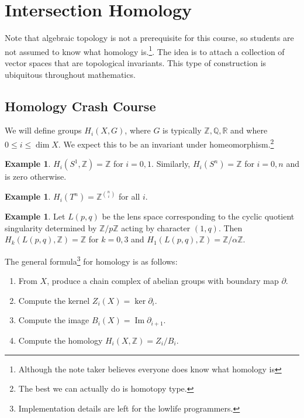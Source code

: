 \documentclass[leqno, openany]{memoir}
\theoremstyle{definition}
\newtheorem{exm}[thm]{Example}
\theoremstyle{remark}
\theoremstyle{plain}
\theoremstyle{definition}
\theoremstyle{remark}
\DeclareMathOperator{\Ima}{\mathrm{Im}}
\newcommand{\R}{\mathbb{R}}
\newcommand{\Z}{\mathbb{Z}}
\newcommand{\Q}{\mathbb{Q}}
\begin{document}
\section{Intersection Homology}%
\label{sec:intersection_homology}

Note that algebraic topology is not a prerequisite for this course, so students are not assumed to know what homology is.\footnote{Although the note taker believes everyone does know what homology is}. The idea is to attach a collection of vector spaces that are topological invariants. This type of construction is ubiquitous throughout mathematics.

\subsection{Homology Crash Course}%
\label{sub:homology_crash_course}

We will define groups $H_i(X, G)$, where $G$ is typically $\Z, \Q, \R$ and where $0 \leq i \leq \dim X$. We expect this to be an invariant under homeomorphism.\footnote{The best we can actually do is homotopy type.}

\begin{exm}
    $H_i(S^1, \Z) = \Z$ for $i = 0,1$. Similarly, $H_i(S^n) = \Z$ for $i = 0,n$ and is zero otherwise.
\end{exm}

\begin{exm}
    $H_i(T^n) = \Z^{\binom{n}{i}}$ for all $i$.
\end{exm}

\begin{exm}
    Let $L(p,q)$ be the lens space corresponding to the cyclic quotient singularity determined by $\Z/p\Z$ acting by character $(1, q)$. Then $H_k(L(p,q), \Z) = \Z$ for $k = 0,3$ and $H_1(L(p,q), \Z) = \Z/\alpha \Z$.
\end{exm}

The general formula\footnote{Implementation details are left for the lowlife programmers.} for homology is as follows:
\begin{enumerate}
    \item From $X$, produce a chain complex of abelian groups with boundary map $\partial$.
    \item Compute the kernel $Z_i(X) = \ker \partial_i$.
    \item Compute the image $B_i(X) = \Ima \partial_{i+1}$.
    \item Compute the homology $H_i(X, \Z) = Z_i / B_i$.
\end{enumerate}
\end{document}
